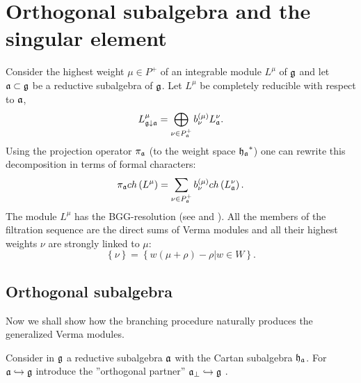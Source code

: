 \documentclass[12pt]{article}
\theoremstyle{definition}
\begin{document}
\section{Orthogonal subalgebra and the singular element}

\label{sec:recurr-form-branch}

Consider the highest weight $\mu \in P^{+}$ of an integrable module $L^{\mu
} $ of $\frak{g}$ and let $\frak{a}\subset \frak{g}$ be a reductive
subalgebra of $\frak{g}$. Let $L^{\mu }$ be completely reducible with
respect to $\frak{a}$, 
\[
L_{\frak{g}\downarrow \frak{a}}^{\mu }=\bigoplus\limits_{\nu \in P_{\frak{a}%
}^{+}}b_{\nu }^{\left( \mu \right) }L_{\frak{a}}^{\nu }. 
\]
Using the projection operator $\pi _{\frak{a}}$ (to the weight space $\frak{%
h_{a}}^{\ast }$) one can rewrite this decomposition in terms of formal
characters: 
\begin{equation}
\pi _{\frak{a}}ch\left( L^{\mu }\right) =\sum_{\nu \in P_{\frak{a}%
}^{+}}b_{\nu }^{(\mu )}ch\left( L_{\frak{a}}^{\nu }\right) .
\label{branching1}
\end{equation}
The module $L^{\mu }$ has the BGG-resolution (see
\cite{bernstein1976category,bernstein1975differential,bernstein1971structure} and \cite{humphreys2008representations}). All
the members of the filtration sequence are the direct sums of Verma modules
and all their highest weights $\nu $ are strongly linked to $\mu $: 
\[
\left\{ \nu \right\} =\left\{ w\left( \mu +\rho \right) -\rho |w\in
W\right\} . 
\]

\subsection{Orthogonal subalgebra}

Now we shall show how the branching procedure naturally produces the
generalized Verma modules.

Consider in $\frak{g}$ a reductive subalgebra $\frak{a}$ with the Cartan
subalgebra $\frak{h}_{\frak{a}}$. For $\frak{a}\hookrightarrow \frak{g}$
introduce the ''orthogonal partner'' $\frak{a}_{\bot }\hookrightarrow \frak{g%
}$ .
\end{document}
